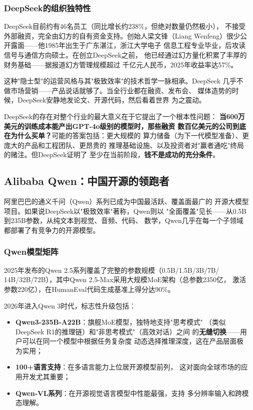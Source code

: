 \subsubsection{DeepSeek的组织独特性}
DeepSeek目前约有46名员工（同比增长约238\%，但绝对数量仍然极小），
不接受外部融资，完全由幻方的自有资金支持。创始人梁文锋（Liang
Wenfeng）很少公开露面——他1985年出生于广东湛江，浙江大学电子
信息工程专业毕业，后攻读信号与通信方向硕士。在创立DeepSeek之前，
他已经通过幻方量化积累了丰厚的财务基础——据报道幻方管理规模超过
千亿元人民币，2025年收益率达57\%。

这种"隐士型"的运营风格与其"极致效率"的技术哲学一脉相承。DeepSeek
几乎不做市场营销——产品说话就够了。当全行业都在融资、发布会、
媒体造势的时候，DeepSeek安静地发论文、开源代码，然后看着世界
为之震动。

DeepSeek的存在对整个行业的最大意义在于它提出了一个根本性问题：
\textbf{当600万美元的训练成本能产出GPT-4o级别的模型时，那些融资
数百亿美元的公司到底在为什么买单？}可能的答案包括：更大规模的
算力储备（为下一代模型准备）、更庞大的产品和工程团队、更昂贵的
推理基础设施、以及投资者对"赢者通吃"终局的赌注。但DeepSeek证明了
至少在当前阶段，\textbf{钱不是成功的充分条件}。

\subsection{Alibaba Qwen：中国开源的领跑者}
\label{subsec:qwen}

阿里巴巴的通义千问（Qwen）系列已成为中国最活跃、覆盖面最广的
开源大模型项目。如果说DeepSeek以"极致效率"著称，Qwen则以
"全面覆盖"见长——从0.5B到235B参数，从纯文本到视觉、音频、代码、
数学，Qwen几乎在每一个子领域都部署了有竞争力的开源模型。

\subsubsection{Qwen模型矩阵}
2025年发布的Qwen 2.5系列覆盖了完整的参数规模（0.5B/1.5B/3B/7B/
14B/32B/72B），其中Qwen 2.5-Max采用大规模MoE架构（总参数2350亿，
激活参数220亿），在HumanEval代码生成基准上得分达90\%。

2026年进入Qwen 3时代，标志性升级包括：
\begin{itemize}
  \item \textbf{Qwen3-235B-A22B}：旗舰MoE模型，独特地支持"思考模式"
    （类似DeepSeek R1的推理链）和"非思考模式"（高效对话）之间
    的\textbf{无缝切换}——用户可以在同一个模型中根据任务复杂度
    动态选择推理深度，这在产品层面极为实用；
  \item \textbf{100+语言支持}：在多语言能力上位居开源模型前列，
    这对面向全球市场的应用开发尤其重要；
  \item \textbf{Qwen-VL系列}：在开源视觉语言模型中性能最强，支持
    多分辨率输入和跨模态理解。
\end{itemize}

